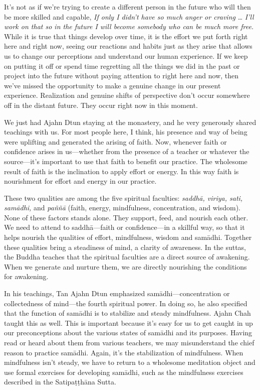 It's not as if we're trying to create a different person in the future 
who will then be more skilled and capable, \emph{If only I didn't have 
so much anger or craving} \ldots{} \emph{I'll work on that so in the 
future I will become somebody who can be much more free.} While it is 
true that things develop over time, it is the effort we put forth right 
here and right now, seeing our reactions and habits just as they arise 
that allows us to change our perceptions and understand our human 
experience. If we keep on putting it off or spend time regretting all 
the things we did in the past or project into the future without paying 
attention to right here and now, then we've missed the opportunity to 
make a genuine change in our present experience. Realization and 
genuine shifts of perspective don't occur somewhere off in the distant 
future. They occur right now in this moment.


We just had Ajahn Dtun staying at the monastery, and he very generously 
shared teachings with us. For most people here, I think, his presence 
and way of being were uplifting and generated the arising of faith. 
Now, whenever faith or confidence arises in us---whether from the 
presence of a teacher or whatever the source---it's important to use 
that faith to benefit our practice. The wholesome result of faith is 
the inclination to apply effort or energy. In this way faith is 
nourishment for effort and energy in our practice.

These two qualities are among the five spiritual faculties: 
\emph{saddhā, viriya, sati, samādhi,} and \emph{paññā} (faith, 
energy, mindfulness, concentration, and wisdom). None of these factors 
stands alone. They support, feed, and nourish each other. We need to 
attend to saddhā---faith or confidence---in a skillful way, so that it 
helps nourish the qualities of effort, mindfulness, wisdom and 
samādhi. Together these qualities bring a steadiness of mind, a 
clarity of awareness. In the suttas, the Buddha teaches that the 
spiritual faculties are a direct source of awakening. When we generate 
and nurture them, we are directly nourishing the conditions for 
awakening.

In his teachings, Tan Ajahn Dtun emphasized samādhi---concentration or 
collectedness of mind---the fourth spiritual power. In doing so, he 
also specified that the function of samādhi is to stabilize and steady 
mindfulness. Ajahn Chah taught this as well. This is important because 
it's easy for us to get caught in up our preconceptions about the 
various states of samādhi and its purposes. Having read or heard about 
them from various teachers, we may misunderstand the chief reason to 
practice samādhi. Again, it's the stabilization of mindfulness. When 
mindfulness isn't steady, we have to return to a wholesome meditation 
object and use formal exercises for developing samādhi, such as the 
mindfulness exercises described in the Satipaṭṭhāna Sutta.

